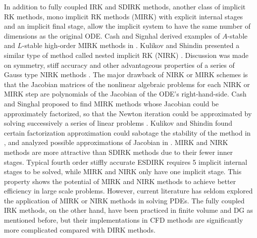 In addition to fully coupled IRK and SDIRK methods,
another class of implicit RK methods,
mono implicit RK methods (MIRK)
\cite{cash1975classMIRKOrig}
with explicit internal stages and
an implicit final stage,
allow the implicit system to
have the same number of dimensions
as the original ODE.
Cash and Signhal derived examples of
$A$-stable and $L$-stable high-order
MIRK methods in
\cite{cash1977clasMIRK1,cash1982monoMIRK2}.
Kulikov and Shindin presented a similar type
of method called nested implicit RK (NIRK)
\cite{kulikov2006familyNIRKOrig}.
Discussion was made on symmetry, stiff accuracy and
other advantageous properties of a series of Gauss type
NIRK methods
\cite{kulikov2009adaptive}.
The major drawback of NIRK or MIRK schemes is that
the Jacobian matrices of the nonlinear algebraic problems
for each NIRK or MIRK step are
polynomials of the Jacobian of the ODE's right-hand-side.
Cash and Singhal proposed to find MIRK methods whose
Jacobian could be approximately factorized,
so that the Newton iteration
could be approximated by solving successively a series of linear
problems \cite{cash1982monoMIRK2}.
Kulikov and Shindin found certain factorization
approximation could sabotage the stability of
the method in
\cite{kulikov2009adaptive},
and analyzed possible approximations of
Jacobian in
\cite{kulikov2007asymptotic}.
MIRK and NIRK methods are more attractive than SDIRK methods
due to their fewer inner stages.
Typical fourth order
stiffly accurate ESDIRK requires 5 implicit internal stages to be
solved,
while MIRK and NIRK only have one implicit stage.
This property shows the potential of MIRK and NIRK methods to achieve better efficiency in
large scale problems.
However, current literature has seldom explored
the application of MIRK or NIRK methods in
solving PDEs.
The fully coupled IRK methods, on the other hand,
have been practiced in
finite volume \cite{jameson2017evaluation} and
DG \cite{pazner2017stage}
as mentioned before,
but their implementations
in CFD methods are significantly more
complicated compared with DIRK methods.

